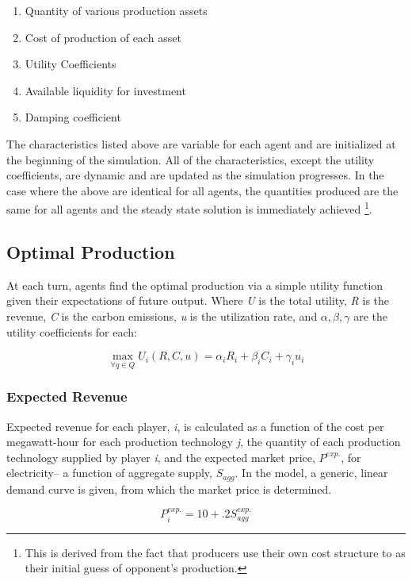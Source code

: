 \documentclass[12pt]{article}
\begin{document}
	\begin{enumerate}
		\item Quantity of various production assets 
		\item Cost of production of each asset
		\item Utility Coefficients
		\item Available liquidity for investment
		\item Damping coefficient
	\end{enumerate} 

The characteristics listed above are variable for each agent and are initialized at the beginning of the simulation. All of the characteristics, except the utility coefficients, are dynamic and are updated as the simulation progresses. In the case where the above are identical for all agents, the quantities produced are the same for all agents and the steady state solution is immediately achieved \footnote{This is derived from the fact that producers use their own cost structure to as their initial guess of opponent's production.}.


\subsection{Optimal Production}
At each turn, agents find the optimal production via a simple utility function given their expectations of future output. Where \emph{U} is the total utility, \emph{R} is the revenue, \emph{C} is the carbon emissions, \emph{u} is the utilization rate, and $\alpha, \beta, \gamma $ are the utility coefficients for each:

	\begin{equation}
		\max_{\forall q \in Q} U_i(R, C, u) = \alpha_{i} R_{i} + \beta_{i} C_{i} + \gamma_{i} u_{i}
	\end{equation}

\subsubsection{Expected Revenue}
Expected revenue for each player, \emph{i}, is calculated as a function of the cost per megawatt-hour for each production technology \emph{j}, the quantity of each production technology supplied by player \emph{i}, and the expected market price, $P^{exp.}$, for electricity--  a function of aggregate supply, $S_{agg}$. In the model, a generic, linear demand curve is given, from which the market price is determined. 

	\begin{equation}
		P^{exp.}_{i} = 10 + .2S_{agg}^{exp.}
	\end{equation}
\end{document}
